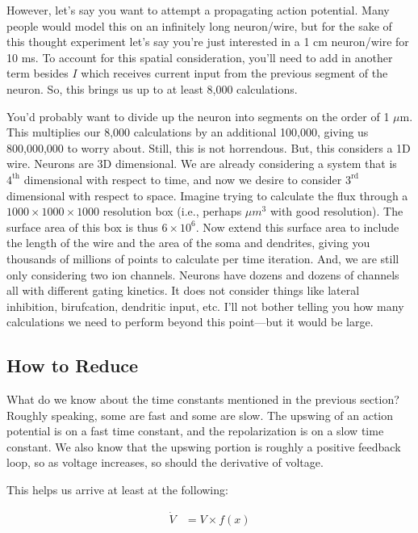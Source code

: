 \documentclass[12pt]{report}
\begin{document}
However, let's say you want to attempt a propagating action potential. Many people would model this on an infinitely long neuron/wire, but for the sake of this thought experiment let's say you're just interested in a 1 cm neuron/wire for 10 ms. To account for this spatial consideration, you'll need to add in another term besides $I$ which receives current input from the previous segment of the neuron. So, this brings us up to at least 8,000 calculations.\newline

You'd probably want to divide up the neuron into segments on the order of 1 $\mu$m. This multiplies our 8,000 calculations by an additional 100,000, giving us 800,000,000 to worry about. Still, this is not horrendous. But, this considers a 1D wire. Neurons are 3D dimensional. We are already considering a system that is $4^{\mathrm{th}}$ dimensional with respect to time, and now we desire to consider $3^{\mathrm{rd}}$ dimensional with respect to space. Imagine trying to calculate the flux through a $1000 \times 1000 \times 1000$ resolution box (i.e., perhaps $\mu m^3$ with good resolution). The surface area of this box is thus $6\times 10^6$. Now extend this surface area to include the length of the wire and the area of the soma and dendrites, giving you thousands of millions of points to calculate per time iteration. And, we are still only considering two ion channels. Neurons have dozens and dozens of channels all with different gating kinetics. It does not consider things like lateral inhibition, birufcation, dendritic input, etc. I'll not bother telling you how many calculations we need to perform beyond this point---but it would be large. 

\subsection{How to Reduce} What do we know about the time constants mentioned in the previous section? Roughly speaking, some are fast and some are slow. The upswing of an action potential is on a fast time constant, and the repolarization is on a slow time constant. We also know that the upswing portion is roughly a positive feedback loop, so as voltage increases, so should the derivative of voltage.\newline

This helps us arrive at least at the following: 

\begin{equation} \label{eq8}
\begin{split}
\dot{V} &= V \times f(x)
\end{split}
\end{equation}
\end{document}
